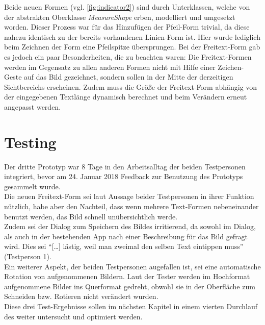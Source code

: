 Beide neuen Formen (vgl. \autoref{fig:indicator2}) sind durch Unterklassen, welche von der abstrakten Oberklasse \emph{MeasureShape} erben, modelliert und umgesetzt worden.
Dieser Prozess war für das Hinzufügen der Pfeil-Form trivial, da diese nahezu identisch zu der bereits vorhandenen Linien-Form ist.
Hier wurde lediglich beim Zeichnen der Form eine Pfeilspitze übersprungen.
Bei der Freitext-Form gab es jedoch ein paar Besonderheiten, die zu beachten waren:
Die Freitext-Formen werden im Gegensatz zu allen anderen Formen nicht mit Hilfe einer Zeichen-Geste auf das Bild gezeichnet, sondern sollen in der Mitte der derzeitigen Sichtbereichs erscheinen.
Zudem muss die Größe der Freitext-Form abhängig von der eingegebenen Textlänge dynamisch berechnet und beim Verändern erneut angepasst werden. \\

\section{Testing}\label{sec:test3}
Der dritte Prototyp war 8 Tage in den Arbeitsalltag der beiden Testpersonen integriert, bevor am 24. Januar 2018 Feedback zur Benutzung des Prototyps gesammelt wurde. \\

Die neuen Freitext-Form sei laut Aussage beider Testpersonen in ihrer Funktion nützlich, habe aber den Nachteil, dass wenn mehrere Text-Formen nebeneinander benutzt werden, das Bild schnell unübersichtlich werde. \\

Zudem sei der Dialog zum Speichern des Bildes irritierend, da sowohl im Dialog, als auch in der bestehenden App nach einer Beschreibung für das Bild gefragt wird.
Dies sei ``[\dots] lästig, weil man zweimal den selben Text eintippen muss'' (Testperson 1). \\

Ein weiterer Aspekt, der beiden Testpersonen augefallen ist, sei eine automatische Rotation von aufgenommenen Bildern.
Laut der Tester werden im Hochformat aufgenommene Bilder ins Querformat gedreht, obwohl sie in der Oberfläche zum Schneiden bzw. Rotieren nicht verändert wurden. \\

Diese drei Test-Ergebnisse sollen im nächsten Kapitel in einem vierten Durchlauf des \hcdp{} weiter untersucht und optimiert werden.
